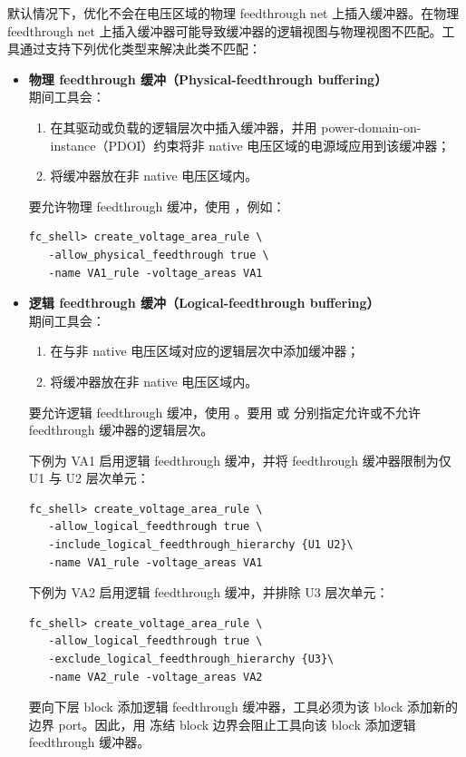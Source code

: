 默认情况下，优化不会在电压区域的物理 feedthrough net 上插入缓冲器。在物理 feedthrough net 上插入缓冲器可能导致缓冲器的逻辑视图与物理视图不匹配。工具通过支持下列优化类型来解决此类不匹配：
\begin{itemize}
  \item \textbf{物理 feedthrough 缓冲（Physical-feedthrough buffering）}\\
    期间工具会：
    \begin{enumerate}
      \item 在其驱动或负载的逻辑层次中插入缓冲器，并用 power-domain-on-instance（PDOI）约束将非 native 电压区域的电源域应用到该缓冲器；
      \item 将缓冲器放在非 native 电压区域内。
    \end{enumerate}
    要允许物理 feedthrough 缓冲，使用 ，例如：
\begin{lstlisting}
fc_shell> create_voltage_area_rule \
   -allow_physical_feedthrough true \
   -name VA1_rule -voltage_areas VA1
\end{lstlisting}

  \item \textbf{逻辑 feedthrough 缓冲（Logical-feedthrough buffering）}\\
    期间工具会：
    \begin{enumerate}
      \item 在与非 native 电压区域对应的逻辑层次中添加缓冲器；
      \item 将缓冲器放在非 native 电压区域内。
    \end{enumerate}
    要允许逻辑 feedthrough 缓冲，使用 。要用  或  分别指定允许或不允许 feedthrough 缓冲器的逻辑层次。

    下例为 VA1 启用逻辑 feedthrough 缓冲，并将 feedthrough 缓冲器限制为仅 U1 与 U2 层次单元：
\begin{lstlisting}
fc_shell> create_voltage_area_rule \
   -allow_logical_feedthrough true \
   -include_logical_feedthrough_hierarchy {U1 U2}\
   -name VA1_rule -voltage_areas VA1
\end{lstlisting}

    下例为 VA2 启用逻辑 feedthrough 缓冲，并排除 U3 层次单元：
\begin{lstlisting}
fc_shell> create_voltage_area_rule \
   -allow_logical_feedthrough true \
   -exclude_logical_feedthrough_hierarchy {U3}\
   -name VA2_rule -voltage_areas VA2
\end{lstlisting}

\begin{noteBox}
要向下层 block 添加逻辑 feedthrough 缓冲器，工具必须为该 block 添加新的边界 port。因此，用  冻结 block 边界会阻止工具向该 block 添加逻辑 feedthrough 缓冲器。
\end{noteBox}
\end{itemize}

